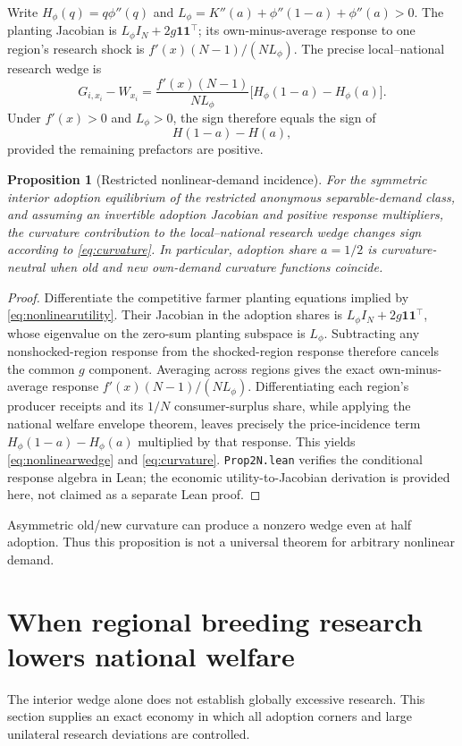 \documentclass[11pt]{article}
\newtheorem{proposition}{Proposition}
\begin{document}
Write $H_\phi(q)=q\phi''(q)$ and $L_\phi=K''(a)+\phi''(1-a)+\phi''(a)>0$. The planting Jacobian is $L_\phi I_N+2g\mathbf1\mathbf1^\top$; its own-minus-average response to one region's research shock is $f'(x)(N-1)/(NL_\phi)$. The precise local--national research wedge is
\begin{equation}
G_{i,x_i}-W_{x_i}
=\frac{f'(x)(N-1)}{NL_\phi}
\bigl[H_\phi(1-a)-H_\phi(a)\bigr].
\label{eq:nonlinearwedge}
\end{equation}
Under $f'(x)>0$ and $L_\phi>0$, the sign therefore equals the sign of
\begin{equation}
 H(1-a)-H(a),
 \label{eq:curvature}
\end{equation}
provided the remaining prefactors are positive.

\begin{proposition}[Restricted nonlinear-demand incidence]
For the symmetric interior adoption equilibrium of the restricted anonymous separable-demand class, and assuming an invertible adoption Jacobian and positive response multipliers, the curvature contribution to the local--national research wedge changes sign according to \eqref{eq:curvature}. In particular, adoption share $a=1/2$ is curvature-neutral when old and new own-demand curvature functions coincide.
\end{proposition}
\begin{proof}
Differentiate the competitive farmer planting equations implied by \eqref{eq:nonlinearutility}. Their Jacobian in the adoption shares is $L_\phi I_N+2g\mathbf1\mathbf1^\top$, whose eigenvalue on the zero-sum planting subspace is $L_\phi$. Subtracting any nonshocked-region response from the shocked-region response therefore cancels the common $g$ component. Averaging across regions gives the exact own-minus-average response $f'(x)(N-1)/(NL_\phi)$. Differentiating each region's producer receipts and its $1/N$ consumer-surplus share, while applying the national welfare envelope theorem, leaves precisely the price-incidence term $H_\phi(1-a)-H_\phi(a)$ multiplied by that response. This yields \eqref{eq:nonlinearwedge} and \eqref{eq:curvature}. \texttt{Prop2N.lean} verifies the conditional response algebra in Lean; the economic utility-to-Jacobian derivation is provided here, not claimed as a separate Lean proof.
\end{proof}
Asymmetric old/new curvature can produce a nonzero wedge even at half adoption. Thus this proposition is not a universal theorem for arbitrary nonlinear demand.

\section{When regional breeding research lowers national welfare}
The interior wedge alone does not establish globally excessive research. This section supplies an exact economy in which all adoption corners and large unilateral research deviations are controlled.
\end{document}
